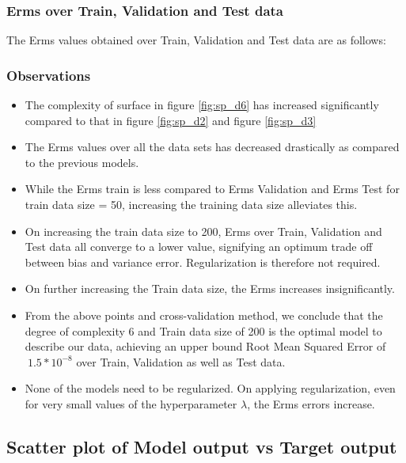 \documentclass[12pt,a4paper]{article}
\begin{document}
\subsubsection{Erms over Train, Validation and Test data}
The Erms values obtained over Train, Validation and Test data are as follows: 
\break



\subsubsection{Observations}
\begin{itemize}
    \item The complexity of surface in figure \ref{fig:sp_d6} has increased significantly compared to that in figure \ref{fig:sp_d2} and figure \ref{fig:sp_d3}
    \item The Erms values over all the data sets has decreased drastically as compared to the previous models.
    \item While the Erms train is less compared to Erms Validation and Erms Test for train data size = 50, increasing the training data size alleviates this. 
    \item On increasing the train data size to 200, Erms over Train, Validation and Test data all converge to a lower value, signifying an optimum trade off between bias and variance error. Regularization is therefore not required.
    \item On further increasing the Train data size, the Erms increases insignificantly. 
    \item From the above points and cross-validation method, we conclude that the degree of complexity 6 and Train data size of 200 is the optimal model to describe our data, achieving an upper bound Root Mean Squared Error of $~1.5*10^{-8}$ over Train, Validation as well as Test data.
    \item None of the models need to be regularized. On applying regularization, even for very small values of the hyperparameter $\lambda$, the Erms errors increase. 
\end{itemize}

\subsection{Scatter plot of Model output vs Target output}
\end{document}
